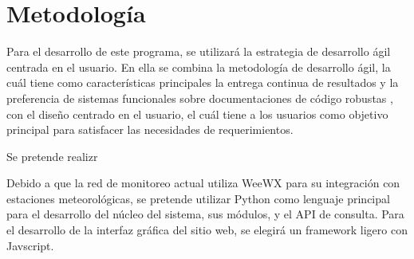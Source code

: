 \section{Metodología}

Para el desarrollo de este programa, se utilizará la estrategia de desarrollo ágil centrada en el usuario. En ella se combina la metodología de desarrollo ágil, la cuál tiene como características principales la entrega continua de resultados y la preferencia de sistemas funcionales sobre documentaciones de código robustas \cite{agile_manifesto}, con el diseño centrado en el usuario, el cuál tiene a los usuarios como objetivo principal para satisfacer las necesidades de requerimientos.


\cite{hussain_agile_usercentered}

Se pretende realizr

Debido a que la red de monitoreo actual utiliza WeeWX para su integración con estaciones meteorológicas\cite{red_climatologica_uacj}, se pretende utilizar Python como lenguaje principal para el desarrollo del núcleo del sistema, sus módulos, y el API de consulta. Para el desarrollo de la interfaz gráfica del sitio web, se elegirá un framework ligero con Javscript.
